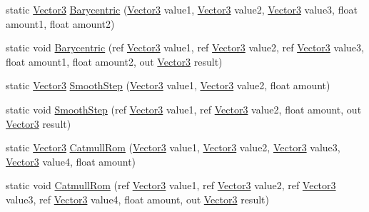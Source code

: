 \begin{DoxyCompactItemize}
static \hyperlink{struct_microsoft_1_1_xna_1_1_framework_1_1_vector3}{Vector3} \hyperlink{struct_microsoft_1_1_xna_1_1_framework_1_1_vector3_a4c77a0beb0357b7e2c919cc2962447a6}{Barycentric} (\hyperlink{struct_microsoft_1_1_xna_1_1_framework_1_1_vector3}{Vector3} value1, \hyperlink{struct_microsoft_1_1_xna_1_1_framework_1_1_vector3}{Vector3} value2, \hyperlink{struct_microsoft_1_1_xna_1_1_framework_1_1_vector3}{Vector3} value3, float amount1, float amount2)
\item 
static void \hyperlink{struct_microsoft_1_1_xna_1_1_framework_1_1_vector3_a0f035f9df4ead19c832cb79171c44a28}{Barycentric} (ref \hyperlink{struct_microsoft_1_1_xna_1_1_framework_1_1_vector3}{Vector3} value1, ref \hyperlink{struct_microsoft_1_1_xna_1_1_framework_1_1_vector3}{Vector3} value2, ref \hyperlink{struct_microsoft_1_1_xna_1_1_framework_1_1_vector3}{Vector3} value3, float amount1, float amount2, out \hyperlink{struct_microsoft_1_1_xna_1_1_framework_1_1_vector3}{Vector3} result)
\item 
static \hyperlink{struct_microsoft_1_1_xna_1_1_framework_1_1_vector3}{Vector3} \hyperlink{struct_microsoft_1_1_xna_1_1_framework_1_1_vector3_a403c78eeda6e921adf2dbcc712fcfce4}{Smooth\+Step} (\hyperlink{struct_microsoft_1_1_xna_1_1_framework_1_1_vector3}{Vector3} value1, \hyperlink{struct_microsoft_1_1_xna_1_1_framework_1_1_vector3}{Vector3} value2, float amount)
\item 
static void \hyperlink{struct_microsoft_1_1_xna_1_1_framework_1_1_vector3_a8f0869f77ce58e938cf539c4d345a5e2}{Smooth\+Step} (ref \hyperlink{struct_microsoft_1_1_xna_1_1_framework_1_1_vector3}{Vector3} value1, ref \hyperlink{struct_microsoft_1_1_xna_1_1_framework_1_1_vector3}{Vector3} value2, float amount, out \hyperlink{struct_microsoft_1_1_xna_1_1_framework_1_1_vector3}{Vector3} result)
\item 
static \hyperlink{struct_microsoft_1_1_xna_1_1_framework_1_1_vector3}{Vector3} \hyperlink{struct_microsoft_1_1_xna_1_1_framework_1_1_vector3_aa780be970dab7f65756db4cdbc88cb9e}{Catmull\+Rom} (\hyperlink{struct_microsoft_1_1_xna_1_1_framework_1_1_vector3}{Vector3} value1, \hyperlink{struct_microsoft_1_1_xna_1_1_framework_1_1_vector3}{Vector3} value2, \hyperlink{struct_microsoft_1_1_xna_1_1_framework_1_1_vector3}{Vector3} value3, \hyperlink{struct_microsoft_1_1_xna_1_1_framework_1_1_vector3}{Vector3} value4, float amount)
\item 
static void \hyperlink{struct_microsoft_1_1_xna_1_1_framework_1_1_vector3_a748d4d23e88e17c5f3083afdaf6f402e}{Catmull\+Rom} (ref \hyperlink{struct_microsoft_1_1_xna_1_1_framework_1_1_vector3}{Vector3} value1, ref \hyperlink{struct_microsoft_1_1_xna_1_1_framework_1_1_vector3}{Vector3} value2, ref \hyperlink{struct_microsoft_1_1_xna_1_1_framework_1_1_vector3}{Vector3} value3, ref \hyperlink{struct_microsoft_1_1_xna_1_1_framework_1_1_vector3}{Vector3} value4, float amount, out \hyperlink{struct_microsoft_1_1_xna_1_1_framework_1_1_vector3}{Vector3} result)

\end{DoxyCompactItemize}
